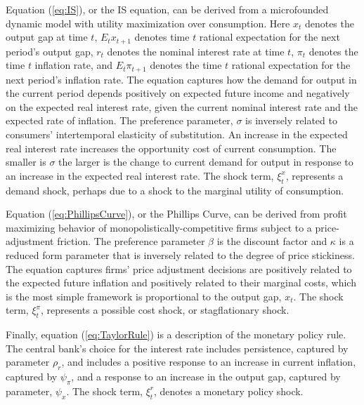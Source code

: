\documentclass[12pt]{article}
\begin{document}
Equation (\ref{eq:IS}), or the IS equation, can be derived from a microfounded dynamic model with utility maximization over consumption. Here $x_t$ denotes the output gap at time $t$, $E_t x_{t+1}$ denotes time $t$ rational expectation for the next period's output gap, $r_t$ denotes the nominal interest rate at time $t$, $\pi_t$ denotes the time $t$ inflation rate, and  $E_t \pi_{t+1}$ denotes the time $t$ rational expectation for the next period's inflation rate. The equation captures how the demand for output in the current period depends positively on expected future income and negatively on the expected real interest rate, given the current nominal interest rate and the expected rate of inflation. The preference parameter, $\sigma$ is inversely related to consumers' intertemporal elasticity of substitution. An increase in the expected real interest rate increases the opportunity cost of current consumption. The smaller is $\sigma$ the larger is the change to current demand for output in response to an increase in the expected real interest rate. The shock term, $\xi_t^x$, represents a demand shock, perhaps due to a shock to the marginal utility of consumption.

Equation (\ref{eq:PhillipsCurve}), or the Phillips Curve, can be derived from profit maximizing behavior of monopolistically-competitive firms subject to a price-adjustment friction. The preference parameter $\beta$ is the discount factor and $\kappa$ is a reduced form parameter that is inversely related to the degree of price stickiness. The equation captures firms' price adjustment decisions are positively related to the expected future inflation and positively related to their marginal costs, which is the most simple framework is proportional to the output gap, $x_t$. The shock term, $\xi_t^\pi$, represents a possible cost shock, or stagflationary shock.

Finally, equation (\ref{eq:TaylorRule}) is a description of the monetary policy rule. The central bank's choice for the interest rate includes persistence, captured by parameter $\rho_r$, and includes a positive response to an increase in current inflation, captured by $\psi_\pi$, and a response to an increase in the output gap, captured by parameter, $\psi_x$. The shock term, $\xi_t^r$, denotes a monetary policy shock.
\end{document}
